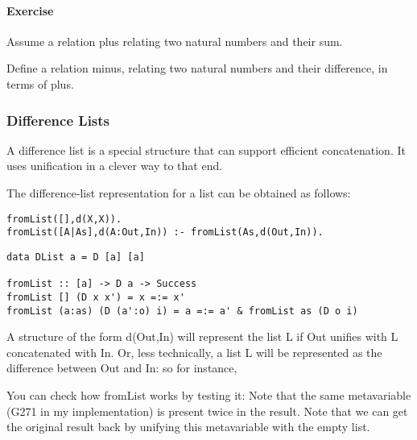 \documentclass{article}
\newcommand{\percents}[1]{\protect \marginpar[l]{\bf [#1]}}
\newcounter{question}
\newcommand{\question}[1]{
  \addtocounter{question}{1}
  \paragraph{Exercise~\arabic{question}  \percents{#1}}
 }
\newenvironment{ex}[1]{\question{#1}}{\vspace{1em}}
\begin{document}
\begin{ex}{*}
  Assume a relation \textsf{plus} relating two natural numbers and
  their sum.

  Define a relation \textsf{minus}, relating two natural numbers and
  their difference, in terms of \textsf{plus}.
\end{ex}

\subsubsection{Difference Lists}

A difference list is a special structure that can support efficient
concatenation. It uses unification in a clever way to that end.

The difference-list representation for a list can be obtained as follows:

\Prolog{}
\begin{verbatim}
fromList([],d(X,X)).
fromList([A|As],d(A:Out,In)) :- fromList(As,d(Out,In)).
\end{verbatim}


\Curry{}
\begin{verbatim}
data DList a = D [a] [a]

fromList :: [a] -> D a -> Success
fromList [] (D x x') = x =:= x'
fromList (a:as) (D (a':o) i) = a =:= a' & fromList as (D o i)
\end{verbatim}


A structure of the form \textsf{d(Out,In)} will represent the list
\textsf{L} if \textsf{Out} unifies with \textsf{L} concatenated with
\textsf{In}. Or, less technically, a list L will be represented as the
difference between Out and In: so for instance,



You can check how fromList works by testing it:
Note that the same metavariable (G271 in my implementation) is present twice in
the result. Note that we can get the original result back by unifying this
metavariable with the empty list.
\end{document}
